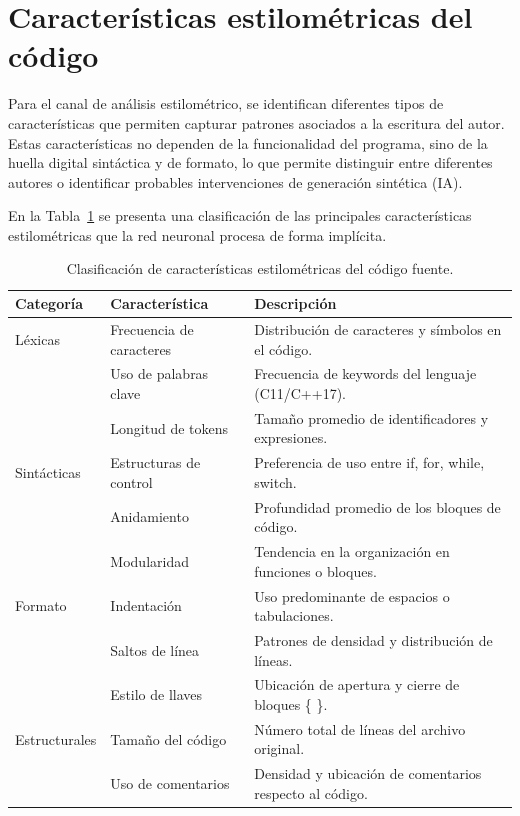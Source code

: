 \section{Características estilométricas del código}

Para el canal de análisis estilométrico, se identifican diferentes tipos de características que permiten capturar patrones asociados a la escritura del autor. Estas características no dependen de la funcionalidad del programa, sino de la huella digital sintáctica y de formato, lo que permite distinguir entre diferentes autores o identificar probables intervenciones de generación sintética (IA).

En la Tabla~\ref{tab:caracteristicas_estilometricas} se presenta una clasificación de las principales características estilométricas que la red neuronal procesa de forma implícita.

\begin{table}[H]
	\centering
	\small
	\begin{tabular}{lll}
		\toprule
		\textbf{Categoría} & \textbf{Característica}  & \textbf{Descripción}                                    \\
		\midrule
		Léxicas            & Frecuencia de caracteres & Distribución de caracteres y símbolos en el código.     \\
		                   & Uso de palabras clave    & Frecuencia de keywords del lenguaje (C11/C++17).        \\
		                   & Longitud de tokens       & Tamaño promedio de identificadores y expresiones.       \\
		\midrule
		Sintácticas        & Estructuras de control   & Preferencia de uso entre if, for, while, switch.        \\
		                   & Anidamiento              & Profundidad promedio de los bloques de código.          \\
		                   & Modularidad              & Tendencia en la organización en funciones o bloques.    \\
		\midrule
		Formato            & Indentación              & Uso predominante de espacios o tabulaciones.            \\
		                   & Saltos de línea          & Patrones de densidad y distribución de líneas.          \\
		                   & Estilo de llaves         & Ubicación de apertura y cierre de bloques \{ \}.        \\
		\midrule
		Estructurales      & Tamaño del código        & Número total de líneas del archivo original.            \\
		                   & Uso de comentarios       & Densidad y ubicación de comentarios respecto al código. \\
		\bottomrule
	\end{tabular}
	\caption{Clasificación de características estilométricas del código fuente.}
	\label{tab:caracteristicas_estilometricas}
\end{table}

